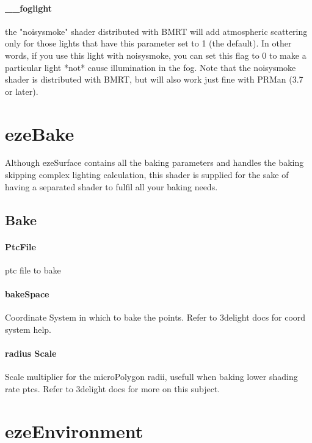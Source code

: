 \documentclass[final,letterpaper,twoside,12pt]{report}
\begin{document}
\subsubsection {\_\_foglight  }
the "noisysmoke" shader distributed with BMRT will add  atmospheric scattering only for those lights that have this  parameter set to 1 (the default).  In other words, if you use  this light with noisysmoke, you can set this flag to 0 to  make a particular light *not* cause illumination in the fog.  Note that the noisysmoke shader is distributed with BMRT, but  will also work just fine with PRMan (3.7 or later).
\smallskip

\chapter{ezeBake}
Although ezeSurface contains all the baking parameters and handles the baking skipping complex lighting calculation, this shader is supplied for the sake of having a separated shader to fulfil all your baking needs.
\section {Bake}
\subsubsection {PtcFile}
ptc file to bake
\smallskip
\subsubsection {bakeSpace}
Coordinate System in which to bake the points. Refer to 3delight docs for coord system help.
\smallskip
\subsubsection {radius Scale}
Scale multiplier for the microPolygon radii, usefull when baking lower shading rate ptcs. Refer to 3delight docs for more on this subject.
\smallskip


\chapter{ezeEnvironment}
\end{document}
